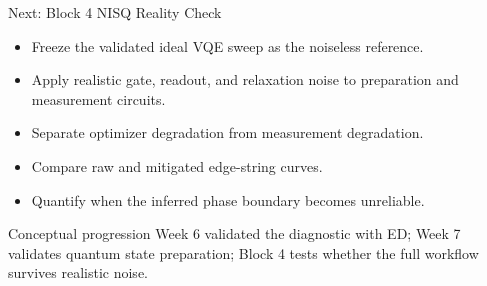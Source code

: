 \documentclass[aspectratio=169,12pt]{beamer}
\begin{document}
\begin{frame}{Next: Block 4 NISQ Reality Check}
  \begin{itemize}
    \item Freeze the validated ideal VQE sweep as the noiseless reference.
    \item Apply realistic gate, readout, and relaxation noise to preparation and measurement circuits.
    \item Separate optimizer degradation from measurement degradation.
    \item Compare raw and mitigated edge-string curves.
    \item Quantify when the inferred phase boundary becomes unreliable.
  \end{itemize}

  \begin{alertblock}{Conceptual progression}
    Week 6 validated the diagnostic with ED; Week 7 validates quantum state preparation; Block 4 tests whether the full workflow survives realistic noise.
  \end{alertblock}
\end{frame}
\end{document}
